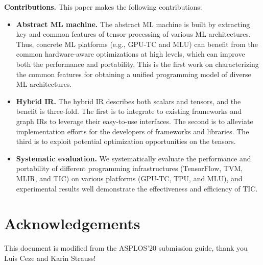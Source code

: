 \documentclass[pageno]{jpaper}
\begin{document}
\textbf{Contributions.} This paper makes the following contributions:

\begin{itemize}

\item \textbf{Abstract ML machine.} The abstract ML machine is built by extracting key and common features of tensor processing of various ML architectures. Thus, concrete ML platforms (e.g., GPU-TC and MLU) can benefit from the common hardware-aware optimizations at high levels, which can improve both the performance and portability, This is the first work on characterizing the common features for obtaining a unified programming model of diverse ML architectures.

\item \textbf{Hybrid IR.} The hybrid IR describes both scalars and tensors, and the benefit is three-fold. The first is to integrate to existing frameworks and graph IRs to leverage their easy-to-use interfaces. The second is to alleviate implementation efforts for the developers of frameworks and libraries. The third is to exploit potential optimization opportunities on the tensors.


\item \textbf{Systematic evaluation.} We systematically evaluate the performance and portability of different programming infrastructures (TensorFlow, TVM, MLIR, and TIC) on various platforms (GPU-TC, TPU, and MLU), and experimental results well demonstrate the effectiveness and efficiency of TIC.


\end{itemize}




\section{Acknowledgements}

This document is modified from the ASPLOS'20 submission guide, thank
you Luis Ceze and Karin Strauss!



\end{document}
